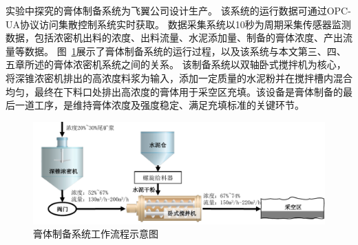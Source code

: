 实验中探究的膏体制备系统为飞翼公司设计生产。
该系统的运行数据可通过OPC-UA协议访问集散控制系统实时获取。
数据采集系统以10秒为周期采集传感器监测数据，包括浓密机出料的浓度、出料流量、水泥添加量、制备的膏体浓度、产出流量等数据。
图~\ref{fig:paste_system}展示了膏体制备系统的运行过程，以及该系统与本文第三、四、五章所述的膏体浓密机系统之间的关系。
该制备系统以双轴卧式搅拌机为核心，将深锥浓密机排出的高浓度料浆为输入，添加一定质量的水泥粉并在搅拌槽内混合均匀，最终在下料口处排出高浓度的膏体用于采空区充填。该设备是膏体制备的最后一道工序，是维持膏体浓度及强度稳定、满足充填标准的关键环节。

\begin{figure}[!htbp]
  \centering
  \includegraphics[width=\textwidth]{figures/chapter4/paste_system.pdf}
  \caption{膏体制备系统工作流程示意图}
\label{fig:paste_system} 
\end{figure}


